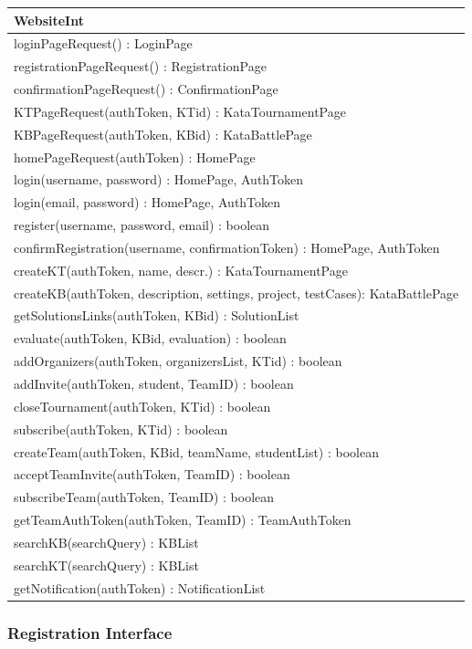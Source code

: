 \documentclass[11pt]{report}
\begin{document}
\begin{longtable}[h] {|p{135mm}|}
\hline
\textbf{WebsiteInt} \\ \hline
loginPageRequest() : LoginPage\\
registrationPageRequest() : RegistrationPage \\
confirmationPageRequest() : ConfirmationPage \\
KTPageRequest(authToken, KTid) : KataTournamentPage \\
KBPageRequest(authToken, KBid) : KataBattlePage \\
homePageRequest(authToken) : HomePage\\
login(username, password) : HomePage, AuthToken\\
login(email, password) : HomePage, AuthToken\\
register(username, password, email) : boolean \\
confirmRegistration(username, confirmationToken) : HomePage, AuthToken \\
createKT(authToken, name, descr.) : KataTournamentPage \\
createKB(authToken, description, settings, project, testCases): KataBattlePage \\
getSolutionsLinks(authToken, KBid) : SolutionList \\
evaluate(authToken, KBid, evaluation) : boolean \\
addOrganizers(authToken, organizersList, KTid) : boolean \\
addInvite(authToken, student, TeamID) : boolean\\
closeTournament(authToken, KTid) : boolean \\
subscribe(authToken, KTid) : boolean \\
createTeam(authToken, KBid, teamName, studentList) : boolean\\
acceptTeamInvite(authToken, TeamID) : boolean \\
subscribeTeam(authToken, TeamID) : boolean \\
getTeamAuthToken(authToken, TeamID) : TeamAuthToken \\
searchKB(searchQuery) : KBList \\
searchKT(searchQuery) : KBList \\
getNotification(authToken) : NotificationList \\
\hline
\end{longtable}

\subsubsection{Registration Interface}
\end{document}
